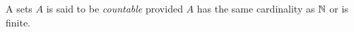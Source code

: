 \guard



\begin{defn}
\label{defn:countable}
  A sets $A$ is said to be \emph{countable} provided $A$ has the same cardinality as $\mathbb{N}$ or is finite.
\end{defn}
